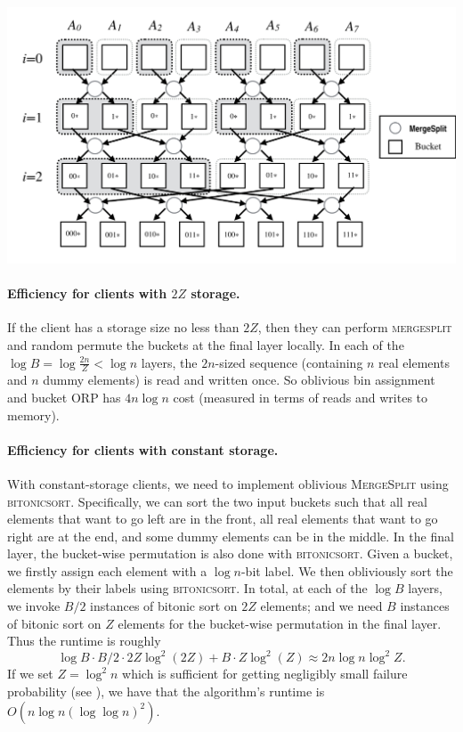 \includegraphics[scale=0.45]{fig2.png}

\paragraph{Efficiency for clients with $2Z$ storage.}

If the client has a storage size no less than $2Z$, then they can perform \textsc{mergesplit} and random permute the buckets at the final layer locally. In each of the $\log B = \log \frac{2n}{Z} < \log n$ layers, the $2n$-sized sequence (containing $n$ real elements and $n$ dummy elements) is read  and written once. So oblivious bin assignment and bucket ORP has $4n\log n$ cost (measured
in terms of reads and writes to memory). 

\paragraph{Efficiency for clients with constant storage.}
With constant-storage clients, we need to implement oblivious \textsc{MergeSplit} using \textsc{bitonicsort}. 
Specifically, we can sort the two input buckets such that all
real elements that want to go left  
are in the front, all real elements that want to go right are at the end,
and some dummy elements can be in the middle.
In the final layer, the bucket-wise permutation is also done with \textsc{bitonicsort}. Given a bucket, we firstly assign  each  element  with a  $\log n$-bit label. We then obliviously  sort  the  elements  by  their  labels using  \textsc{bitonicsort}.  In total, at each of the $\log B$ layers, we invoke $B/2$ instances of bitonic sort on $2Z$ elements; and we need $B$
instances of bitonic sort on $Z$ elements  
for the bucket-wise permutation in the final layer.
Thus the  runtime  is  roughly  
\[
\log B\cdot B/2\cdot 2Z\log^2(2Z)
 + B\cdot Z\log^2(Z)
\approx 2n\log n\log^2Z.\]
If we set $Z = \log^2 n$ which is sufficient
for getting negligibly small failure probability
(see ), we have that the  
algorithm's runtime is $O(n \log n (\log \log n)^2)$.


